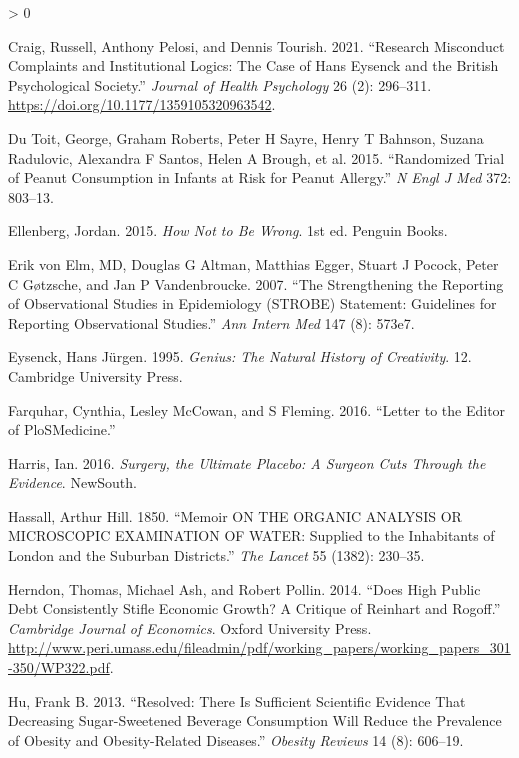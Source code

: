\documentclass[
  10pt,
  b5paper]{book}
\newlength{\cslhangindent}
\newenvironment{CSLReferences}[2] %
 {%
  \setlength{\parindent}{0pt}
  \ifodd #1 \everypar{\setlength{\hangindent}{\cslhangindent}}\ignorespaces\fi
  \ifnum #2 > 0
  \setlength{\parskip}{#2\baselineskip}
  \fi
 }%
 {}
\begin{document}
\begin{CSLReferences}{1}{0}
\leavevmode\hypertarget{ref-CraigEtAl}{}%
Craig, Russell, Anthony Pelosi, and Dennis Tourish. 2021. {``Research Misconduct Complaints and Institutional Logics: The Case of Hans Eysenck and the British Psychological Society.''} \emph{Journal of Health Psychology} 26 (2): 296--311. \url{https://doi.org/10.1177/1359105320963542}.

\leavevmode\hypertarget{ref-du2015randomized}{}%
Du Toit, George, Graham Roberts, Peter H Sayre, Henry T Bahnson, Suzana Radulovic, Alexandra F Santos, Helen A Brough, et al. 2015. {``Randomized Trial of Peanut Consumption in Infants at Risk for Peanut Allergy.''} \emph{N Engl J Med} 372: 803--13.

\leavevmode\hypertarget{ref-ellenberg_2015}{}%
Ellenberg, Jordan. 2015. \emph{How Not to Be Wrong}. 1st ed. Penguin Books.

\leavevmode\hypertarget{ref-erik2007strengthening}{}%
Erik von Elm, MD, Douglas G Altman, Matthias Egger, Stuart J Pocock, Peter C Gøtzsche, and Jan P Vandenbroucke. 2007. {``The Strengthening the Reporting of Observational Studies in Epidemiology (STROBE) Statement: Guidelines for Reporting Observational Studies.''} \emph{Ann Intern Med} 147 (8): 573e7.

\leavevmode\hypertarget{ref-eysenck1995genius}{}%
Eysenck, Hans Jürgen. 1995. \emph{Genius: The Natural History of Creativity}. 12. Cambridge University Press.

\leavevmode\hypertarget{ref-farquhar2016letter}{}%
Farquhar, Cynthia, Lesley McCowan, and S Fleming. 2016. {``Letter to the Editor of PloSMedicine.''}

\leavevmode\hypertarget{ref-harris2016book}{}%
Harris, Ian. 2016. \emph{Surgery, the Ultimate Placebo: A Surgeon Cuts Through the Evidence}. NewSouth.

\leavevmode\hypertarget{ref-hassall1850memoir}{}%
Hassall, Arthur Hill. 1850. {``Memoir ON THE ORGANIC ANALYSIS OR MICROSCOPIC EXAMINATION OF WATER: Supplied to the Inhabitants of London and the Suburban Districts.''} \emph{The Lancet} 55 (1382): 230--35.

\leavevmode\hypertarget{ref-herndon2014does}{}%
Herndon, Thomas, Michael Ash, and Robert Pollin. 2014. {``Does High Public Debt Consistently Stifle Economic Growth? A Critique of Reinhart and Rogoff.''} \emph{Cambridge Journal of Economics}. Oxford University Press. \url{http://www.peri.umass.edu/fileadmin/pdf/working_papers/working_papers_301-350/WP322.pdf}.

\leavevmode\hypertarget{ref-hu2013resolved}{}%
Hu, Frank B. 2013. {``Resolved: There Is Sufficient Scientific Evidence That Decreasing Sugar-Sweetened Beverage Consumption Will Reduce the Prevalence of Obesity and Obesity-Related Diseases.''} \emph{Obesity Reviews} 14 (8): 606--19.


\end{CSLReferences}
\end{document}
